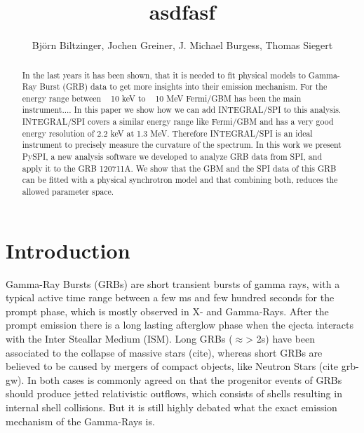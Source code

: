 \documentclass[twocolumn]{aa}
\begin{document}
\title{asdfasf}

\author{Björn Biltzinger, Jochen Greiner, J. Michael Burgess, Thomas Siegert}

\begin{abstract}
  In the last years it has been shown, that it is needed to fit physical models to Gamma-Ray Burst (GRB) data to get more insights into their emission mechanism. For the energy range between ~ 10 keV to ~ 10 MeV Fermi/GBM has been the main instrument.... In this paper we show how we can add INTEGRAL/SPI to this analysis. INTEGRAL/SPI covers a similar energy range like Fermi/GBM and has a very good energy resolution of 2.2 keV at 1.3 MeV. Therefore INTEGRAL/SPI is an ideal instrument to precisely measure the curvature of the spectrum. In this work we present PySPI, a new analysis software we developed to analyze GRB data from SPI, and apply it to the GRB 120711A. We show that the GBM and the SPI data of this GRB can be fitted with a physical synchrotron model and that combining both, reduces the allowed parameter space.

\end{abstract}

\section{Introduction}
Gamma-Ray Bursts (GRBs) are short transient bursts of gamma rays, with a typical active time range between a few ms and few hundred seconds for the prompt phase, which is mostly observed in X- and Gamma-Rays. After the prompt emission there is a long lasting afterglow phase when the ejecta interacts with the Inter Steallar Medium (ISM). Long GRBs ($\approx$> 2s) have been associated to the collapse of massive stars (cite), whereas short GRBs are believed to be caused by mergers of compact objects, like Neutron Stars (cite grb-gw). In both cases is commonly agreed on that the progenitor events of GRBs should produce jetted relativistic outflows, which consists of shells resulting in internal shell collisions. But it is still highly debated what the exact emission mechanism of the Gamma-Rays is.
\end{document}

